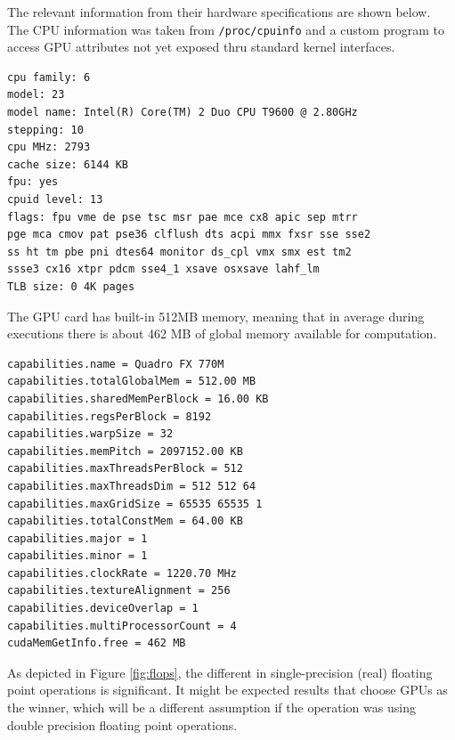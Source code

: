 \documentclass{llncs}
\begin{document}
\smallskip

The relevant information from their hardware specifications are shown below. The CPU information was taken from {\tt /proc/cpuinfo} and a custom program to access GPU attributes not yet exposed thru standard kernel interfaces.

\begin{verbatim}
cpu family: 6
model: 23
model name: Intel(R) Core(TM) 2 Duo CPU T9600 @ 2.80GHz
stepping: 10
cpu MHz: 2793
cache size: 6144 KB
fpu: yes
cpuid level: 13
flags: fpu vme de pse tsc msr pae mce cx8 apic sep mtrr
pge mca cmov pat pse36 clflush dts acpi mmx fxsr sse sse2
ss ht tm pbe pni dtes64 monitor ds_cpl vmx smx est tm2
ssse3 cx16 xtpr pdcm sse4_1 xsave osxsave lahf_lm
TLB size: 0 4K pages
\end{verbatim}

The GPU card has built-in 512MB memory, meaning that in average during executions
there is about 462 MB of global memory available for computation.

\begin{verbatim}
capabilities.name = Quadro FX 770M
capabilities.totalGlobalMem = 512.00 MB
capabilities.sharedMemPerBlock = 16.00 KB
capabilities.regsPerBlock = 8192
capabilities.warpSize = 32
capabilities.memPitch = 2097152.00 KB
capabilities.maxThreadsPerBlock = 512
capabilities.maxThreadsDim = 512 512 64
capabilities.maxGridSize = 65535 65535 1
capabilities.totalConstMem = 64.00 KB
capabilities.major = 1
capabilities.minor = 1
capabilities.clockRate = 1220.70 MHz
capabilities.textureAlignment = 256
capabilities.deviceOverlap = 1
capabilities.multiProcessorCount = 4
cudaMemGetInfo.free = 462 MB
\end{verbatim}

As depicted in Figure \ref{fig:flops}, the different in single-precision (real) floating point operations is significant.
It might be expected results that choose GPUs as the winner, which will be a different assumption if the operation was using double precision floating point operations.
\end{document}
